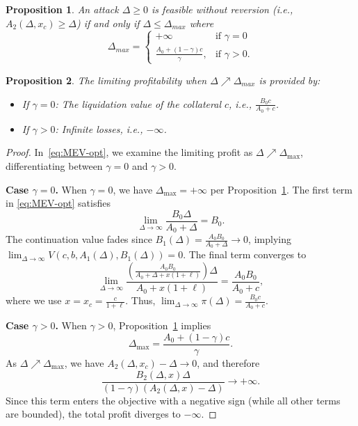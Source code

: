 \documentclass[10pt,a4paper]{amsart}
\newtheorem{proposition}{Proposition}
\begin{document}
\begin{proposition}\label{pr:delta_max}
An attack $\Delta \geq 0$ is feasible without reversion (i.e., $A_2(\Delta,x_c) \geq \Delta$) if and only if $\Delta \leq \Delta_{max}$ where
\[\Delta_{max} = \begin{cases} +\infty & \text{if } \gamma = 0 \\ \frac{A_0+(1-\gamma)c}{\gamma}, & \text{if } \gamma > 0. \end{cases}\]
\end{proposition}

\begin{proposition}\label{pr:limit}
The limiting profitability when $\Delta \nearrow \Delta_{max}$ is provided by:
\begin{itemize}
    \item If $\gamma = 0$: The liquidation value of the collateral $c$, i.e., $\frac{B_0 c}{A_0 + c}$.
    \item If $\gamma > 0$: Infinite losses, i.e., $-\infty$.
\end{itemize}
\end{proposition}

\begin{proof}
In~\eqref{eq:MEV-opt}, we examine the limiting profit as $\Delta \nearrow \Delta_{\max}$, differentiating between $\gamma=0$ and $\gamma>0$.

\noindent\textbf{Case $\gamma=0$.}
When $\gamma=0$, we have $\Delta_{\max}=+\infty$ per Proposition~\ref{pr:delta_max}. The first term in \eqref{eq:MEV-opt} satisfies
$$\lim_{\Delta\to\infty}\frac{B_0\Delta}{A_0+\Delta}=B_0.$$
The continuation value fades since $B_1(\Delta)=\frac{A_0B_0}{A_0+\Delta}\to 0$, implying
$\lim_{\Delta\to\infty}V(c,b,A_1(\Delta),B_1(\Delta))=0.$
The final term converges to
$$\lim_{\Delta\to\infty}\frac{\left(\frac{A_0B_0}{A_0+\Delta+x(1+\ell)}\right)\Delta}{A_0+x(1+\ell)}=\frac{A_0B_0}{A_0+c},$$
where we use $x=x_c=\frac{c}{1+\ell}$. Thus, $\lim_{\Delta\to\infty}\pi(\Delta)=\frac{B_0c}{A_0+c}.$

\noindent\textbf{Case $\gamma>0$.}
When $\gamma>0$, Proposition~\ref{pr:delta_max} implies
\[
\Delta_{\max}=\frac{A_0+(1-\gamma)c}{\gamma}.
\]
As $\Delta\nearrow\Delta_{\max}$, we have $A_2(\Delta,x_c)-\Delta\to 0$, and therefore
\[
\frac{B_2(\Delta,x)\Delta}{(1-\gamma)(A_2(\Delta,x)-\Delta)}\to+\infty.
\]
Since this term enters the objective with a negative sign (while all other terms are bounded), the total profit diverges to $-\infty$.
\end{proof}
\end{document}
